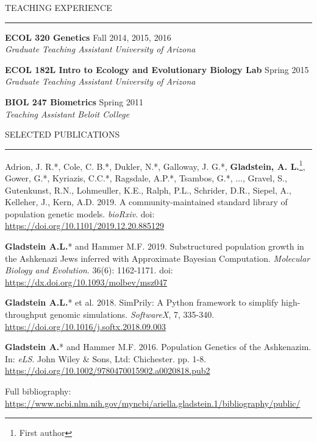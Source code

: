 \documentclass{resume} %
\renewenvironment{rSection}[1]{
\sectionskip
\textcolor{RoyalPurple}{\MakeUppercase{#1}}
\sectionlineskip
\hrule
\begin{list}{}{
\setlength{\leftmargin}{1.5em}
}
\item[]
}{
\end{list}
}
\begin{document}
\begin{rSection}{Teaching Experience}

{\bf ECOL 320 Genetics} \hfill Fall 2014, 2015, 2016 \\ 
{\em Graduate Teaching Assistant} \hfill {\em University of Arizona}

{\bf ECOL 182L Intro to Ecology and Evolutionary Biology Lab} \hfill Spring 2015 \\ 
{\em Graduate Teaching Assistant} \hfill {\em University of Arizona}

{\bf BIOL 247 Biometrics} \hfill Spring 2011 \\ 
{\em Teaching Assistant} \hfill {\em Beloit College}


\end{rSection}



\begin{rSection}{Selected Publications}

\item Adrion, J. R.*, Cole, C. B.*, Dukler, N.*, Galloway, J. G.*, \textbf{Gladstein, A. L.}\footnote{First author}, Gower, G.*, Kyriazis, C.C.*, Ragsdale, A.P.*, Tsambos, G.*, $\ldots$, Gravel, S., Gutenkunst, R.N., Lohmeuller, K.E., Ralph, P.L., Schrider, D.R., Siepel, A., Kelleher, J., Kern, A.D. 2019. A community-maintained standard library of population genetic models. \textit{bioRxiv}. doi: \url{https://doi.org/10.1101/2019.12.20.885129}

\item \textbf{Gladstein A.L.}* and Hammer M.F. 2019. Substructured population growth in the Ashkenazi Jews inferred with Approximate Bayesian Computation. \textit{Molecular Biology and Evolution}. 36(6): 1162-1171. doi: \url{https://dx.doi.org/10.1093/molbev/msz047}

\item \textbf{Gladstein A.L.}* et al. 2018. SimPrily: A Python framework to simplify high-throughput genomic simulations. \textit{SoftwareX}, 7, 335-340. \url{https://doi.org/10.1016/j.softx.2018.09.003}

\item \textbf{Gladstein A.}* and Hammer M.F. 2016. Population Genetics of the Ashkenazim. In: \textit{eLS}. John Wiley \& Sons, Ltd: Chichester. pp. 1-8. \url{https://doi.org/10.1002/9780470015902.a0020818.pub2}

Full bibliography: \url{https://www.ncbi.nlm.nih.gov/myncbi/ariella.gladstein.1/bibliography/public/}


\end{rSection}
\end{document}
